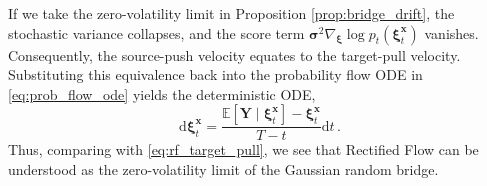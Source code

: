 \documentclass{article}
\theoremstyle{definition}
\begin{document}
If we take the zero-volatility limit in  Proposition \ref{prop:bridge_drift}, the stochastic variance collapses, and the score term $\boldsymbol{\sigma}^2 \nabla_{\boldsymbol{\xi}} \log p_t(\boldsymbol{\xi}^{\boldsymbol{x}}_t)$ vanishes. Consequently, the source-push velocity equates to the target-pull velocity. Substituting this equivalence back into the probability flow ODE in \eqref{eq:prob_flow_ode} yields the deterministic ODE,
    \begin{equation}
        \mathrm{d}\boldsymbol{\xi}^{\boldsymbol{x}}_t = \frac{\mathbb{E}[\boldsymbol{Y} \mid \boldsymbol{\xi}^{\boldsymbol{x}}_t] - \boldsymbol{\xi}^{\boldsymbol{x}}_t}{T-t} \mathrm{d}t \, . \label{eq:zero_vol_ode}
    \end{equation}
Thus, comparing with \eqref{eq:rf_target_pull}, we see that Rectified Flow can be understood as the zero-volatility limit of the Gaussian random bridge.
\end{document}
